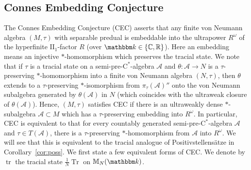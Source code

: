 \documentclass[12pt]{amsart}
\theoremstyle{definition}
\begin{document}
\subsection{Connes Embedding Conjecture}\label{sec:cec}
The Connes Embedding Conjecture (CEC)
asserts that any finite von Neumann algebra $(M,\tau)$ with
separable predual is embeddable into the ultrapower $R^\omega$ of
the hyperfinite $\mathrm{II}_1$-factor $R$ (over ${{\mathbbm k}}\in\{{{\mathbb C}},{{\mathbb R}}\}$).
Here an embedding means an injective $*$-homomorphism which preserves
the tracial state. We note that if $\tau$ is a tracial state on a {semi-pre-$\mathrm{C}^*$-alge\-bra\xspace} ${{\mathcal A}}$
and $\theta\colon{{\mathcal A}} \to N$ is a {$\tau$-pre\-serv\-ing\xspace} {$*$-homo\-mor\-phism\xspace} into
a finite von Neumann algebra $(N,\tau)$, then $\theta$ extends to a
{$\tau$-pre\-serv\-ing\xspace} {$*$-iso\-mor\-phism\xspace} from $\pi_\tau({{\mathcal A}})''$ onto the von Neumann subalgebra generated by $\theta({{\mathcal A}})$
in $N$ (which coincides with the ultraweak closure of $\theta({{\mathcal A}})$).
Hence, $(M,\tau)$ satisfies CEC if there is an ultraweakly dense $*$-subalgebra
${{\mathcal A}}\subset M$ which has a {$\tau$-pre\-serv\-ing\xspace} embedding into $R^\omega$.
In particular, CEC is equivalent to that for every countably
generated {semi-pre-$\mathrm{C}^*$-alge\-bra\xspace} ${{\mathcal A}}$ and $\tau\in T({{\mathcal A}})$,
there is a {$\tau$-pre\-serv\-ing\xspace} {$*$-homo\-mor\-phism\xspace} from ${{\mathcal A}}$ into $R^\omega$.
We will see that this is equivalent to the tracial analogue of
{Positiv\-stellen\-s\"atze\xspace} in Corollary~\ref{cor:poss}.
We first state a few equivalent forms of CEC.
We denote by $\operatorname*{tr}$ the tracial state $\frac{1}{N}\operatorname*{Tr}$ on ${{\mathbb M}}_N({{\mathbbm k}})$.
\end{document}
